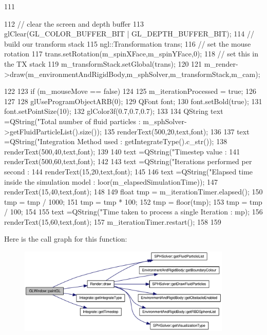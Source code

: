 \begin{DoxyCode}
111 {
112     // clear the screen and depth buffer
113     glClear(GL_COLOR_BUFFER_BIT | GL_DEPTH_BUFFER_BIT);
114    // build our transform stack
115     ngl::Transformation trans;
116     // set the mouse rotation
117     trans.setRotation(m_spinXFace,m_spinYFace,0);
118     // set this in the TX stack
119     m_transformStack.setGlobal(trans);
120 
121     m_render->draw(m_environmentAndRigidBody,m_sphSolver,m_transformStack,m_cam);
      
122 
123     if (m_mouseMove == false)
124     {
125         m_iterationProcessed = true;
126     }
127 
128     glUseProgramObjectARB(0);
129     QFont font;
130     font.setBold(true);
131     font.setPointSize(10);
132     glColor3f(0.7,0.7,0.7);
133 
134     QString text =QString("Total number of fluid particles : %
      m_sphSolver->getFluidParticleList().size());
135     renderText(500,20,text,font);
136 
137     text =QString("Integration Method used : %
      getIntegrateType().c_str());
138     renderText(500,40,text,font);
139 
140     text =QString("Timestep value : %
141     renderText(500,60,text,font);
142 
143     text =QString("Iterations performed per second : %
144     renderText(15,20,text,font);
145 
146     text =QString("Elapsed time inside the simulation model : %
      loor(m_elapsedSimulationTime));
147     renderText(15,40,text,font);
148 
149     float tmp = m_iterationTimer.elapsed();
150     tmp = tmp /  1000;
151     tmp = tmp * 100;
152     tmp = floor(tmp);
153     tmp = tmp / 100;
154 
155     text =QString("Time taken to process a single Iteration : %
      mp);
156     renderText(15,60,text,font);
157     m_iterationTimer.restart();
158 
159 }
\end{DoxyCode}




Here is the call graph for this function:\nopagebreak
\begin{figure}[H]
\begin{center}
\leavevmode
\includegraphics[width=288pt]{class_g_l_window_a9bd2503dd5f812c10a9481f22ecd3403_cgraph}
\end{center}
\end{figure}


